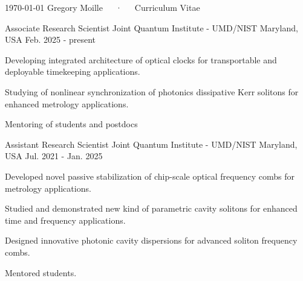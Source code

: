 \documentclass[11pt, a4paper]{customcv}
\begin{document}
\makecvheader
\makecvfooter
  {\today}
  {Gregory Moille~~~·~~~Curriculum Vitae}
  {\thepage}

%
{%
}
%
{
    \cventry%
        {Associate Research Scientist} %
        {Joint Quantum Institute - UMD/NIST} %
        {Maryland, USA} %
        {Feb. 2025 - present} %
        {
        \begin{cvitems} %
            \item{Developing integrated architecture of optical clocks for transportable and deployable timekeeping applications.}
            \item {Studying of nonlinear synchronization of photonics dissipative Kerr solitons for enhanced metrology applications.}
            \item{Mentoring of students and postdocs}
        \end{cvitems}
        }    
    \cventry%
        {Assistant Research Scientist} %
        {Joint Quantum Institute - UMD/NIST} %
        {Maryland, USA} %
        {Jul. 2021 - Jan. 2025} %
        {
          \begin{cvitems} %
            \item {Developed novel passive stabilization of chip-scale optical frequency combs for metrology applications.}
            \item {Studied and demonstrated new kind of  parametric cavity solitons for enhanced time and frequency applications.}
            \item {Designed innovative photonic cavity dispersions for advanced soliton frequency combs.}
            \item {Mentored students.}
          \end{cvitems}
}}
\end{document}
